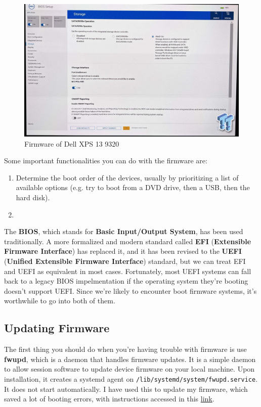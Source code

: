 \documentclass{article}
\begin{document}
  \begin{figure}[hbt!]
    \centering 
    \includegraphics[scale=0.3]{img/xps_firmware.jpg}
    \caption{Firmware of Dell XPS 13 9320} 
    \label{fig:xps_firmware}
  \end{figure}

  Some important functionalities you can do with the firmware are: 
  \begin{enumerate} 
    \item Determine the boot order of the devices, usually by prioritizing a list of available options (e.g. try to boot from a DVD drive, then a USB, then the hard disk). 
    \item 
  \end{enumerate}

  The \textbf{BIOS}, which stands for \textbf{Basic Input/Output System}, has been used traditionally. A more formalized and modern standard called \textbf{EFI} (\textbf{Extensible Firmware Interface}) has replaced it, and it has been revised to the \textbf{UEFI} (\textbf{Unified Extensible Firmware Interface}) standard, but we can treat EFI and UEFI as equivalent in most cases. Fortunately, most UEFI systems can fall back to a legacy BIOS impelmentation if the operating system they're booting doesn't support UEFI. Since we're likely to encounter boot firmware systems, it's worthwhile to go into both of them. 

  \subsection{Updating Firmware}

    The first thing you should do when you're having trouble with firmware is use \textbf{fwupd}, which is a daemon that handles firmware updates. It is a simple daemon to allow session software to update device firmware on your local machine. Upon installation, it creates a systemd agent on \texttt{/lib/systemd/system/fwupd.service}. It does not start automatically. I have used this to update my firmware, which saved a lot of booting errors, with instructions accessed in this \href{https://wiki.archlinux.org/title/fwupd}{link}. 
\end{document}
